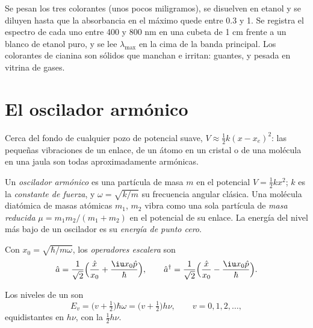 \begin{inthelab}
Se pesan los tres colorantes (unos pocos miligramos), se disuelven en etanol y se
diluyen hasta que la absorbancia en el máximo quede entre 0.3 y 1. Se
registra el espectro de cada uno entre 400 y 800 nm en una cubeta de 1 cm
frente a un blanco de etanol puro, y se lee $\lambda_{\max}$ en la cima de la
banda principal. Los colorantes de cianina son sólidos que manchan e irritan: guantes, y
pesada en vitrina de gases.
\end{inthelab}

\section{El oscilador armónico}

Cerca del fondo de cualquier pozo de potencial suave, $V \approx \frac12 k(x - x_e)^2$:
las pequeñas vibraciones de un enlace, de un átomo en un cristal o de una molécula en una
jaula son todas aproximadamente armónicas.

\begin{definition}\label{def:b3:quantum-model-systems:oscillator}
Un \emph{oscilador armónico} es una partícula de
masa $m$ en el potencial $V = \frac12 kx^2$; $k$ es la \emph{constante
de fuerza}, y $\omega = \sqrt{k/m}$ su frecuencia
angular clásica. Una molécula diatómica de masas atómicas $m_1$, $m_2$
vibra como una sola partícula de \emph{masa reducida}
$\mu = m_1m_2/(m_1 + m_2)$ en el potencial de su enlace. La energía del
nivel más bajo de un oscilador es su \emph{energía de punto cero}.
\end{definition}

\begin{definition}\label{def:b3:quantum-model-systems:ladder}
Con $x_0 = \sqrt{\hbar/m\omega}$, los \emph{operadores escalera}
son
\[
\hat a = \frac{1}{\sqrt2}\Big(\frac{\hat x}{x_0} + \frac{\iu x_0\hat p}{\hbar}\Big),
\qquad \hat a^\dagger = \frac{1}{\sqrt2}\Big(\frac{\hat x}{x_0} -
\frac{\iu x_0\hat p}{\hbar}\Big).
\]
\end{definition}

\begin{theorem}\label{thm:b3:quantum-model-systems:oscillator}
Los niveles de un  son
\[
E_v = \big(v + \tfrac12\big)\hbar\omega = \big(v + \tfrac12\big)h\nu, \qquad v =
0, 1, 2, \dots,
\]
equidistantes en $h\nu$, con la  $\frac12h\nu$.
\end{theorem}

